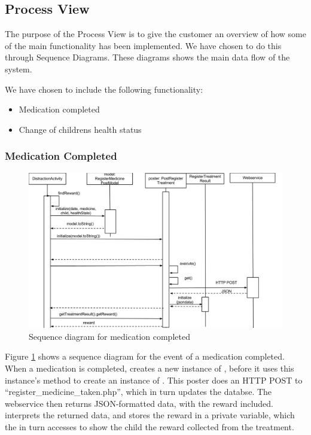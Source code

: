 \subsection{Process View}
\label{sec:processView}
The purpose of the Process View is to give the customer an overview of how some
of the main functionality has been implemented. We have chosen to do this
through Sequence Diagrams. These diagrams shows the main data flow of the system.

We have chosen to include the following functionality:
\begin{itemize}
	\item Medication completed
	\item Change of childrens health status
\end{itemize}



\subsubsection{Medication Completed}
\begin{figure}[h!]
	\centering
		\includegraphics[width = 17.5 cm]{Pictures/ArchPictures/gapparchpictures/medication_finished.png}
	\caption{Sequence diagram for medication completed}
	\label{fig:seq-diagram-medication}
\end{figure}

Figure \ref{fig:seq-diagram-medication} shows a sequence diagram for the event of a medication completed. 
When a medication is completed,  creates a new instance of , before it uses this instance's  method to 
create an instance of . This poster does an HTTP POST to ``register\_medicine\_taken.php'', which 
in turn updates the databse. The webservice then returns JSON-formatted data, with the reward included.  
interprets the returned data, and stores the reward in a private variable, which the  in turn accesses to show the 
child the reward collected from the treatment.

